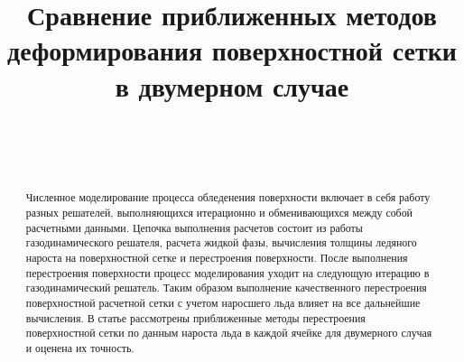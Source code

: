 \documentclass[
11pt,%
tightenlines,%
twoside,%
onecolumn,%
nofloats,%
nobibnotes,%
nofootinbib,%
superscriptaddress,%
noshowpacs,%
centertags]%
{revtex4}
\begin{document}

\title{Сравнение приближенных методов деформирования поверхностной сетки в двумерном случае}

\author{~}
 

\author{~}
 



\begin{abstract}
Численное моделирование процесса обледенения поверхности включает в себя работу разных решателей, выполняющихся итерационно и обменивающихся между собой расчетными данными.
Цепочка выполнения расчетов состоит из работы газодинамического решателя, расчета жидкой фазы, вычисления толщины ледяного нароста на поверхностной сетке и перестроения поверхности.
После выполнения перестроения поверхности процесс моделирования уходит на следующую итерацию в газодинамический решатель.
Таким образом выполнение качественного перестроения поверхностной расчетной сетки с учетом наросшего льда влияет на все дальнейшие вычисления.
В статье рассмотрены приближенные методы перестроения поверхностной сетки по данным нароста льда в каждой ячейке для двумерного случая и оценена их точность.
\end{abstract}

\end{document}
